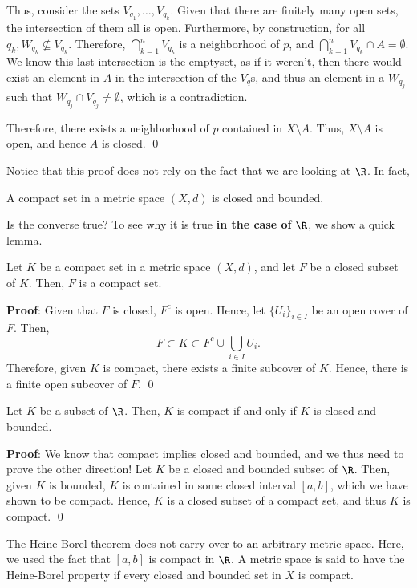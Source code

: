 Thus, consider the sets $V_{q_1}, \dots, V_{q_k}$. Given that there are finitely many open sets, the intersection of them all is open. Furthermore, by construction, for all $q_k, W_{q_k} \not\subseteq V_{q_k}$. Therefore, $\bigcap_{k=1}^n V_{q_k}$ is a neighborhood of $p$, and $\bigcap_{k=1}^n V_{q_k} \cap A = \emptyset$. We know this last intersection is the emptyset, as if it weren't, then there would exist an element in $A$ in the intersection of the $V_q$s, and thus an element in a $W_{q_j}$ such that $W_{q_j} \cap V_{q_j} \neq \emptyset$, which is a contradiction. 

Therefore, there exists a neighborhood of $p$ contained in $X\setminus A$. Thus, $X\setminus A$ is open, and hence $A$ is closed. \qed 

Notice that this proof does not rely on the fact that we are looking at $\R$. In fact,
\begin{lemma}
A compact set in a metric space $(X,d)$ is closed and bounded.
\end{lemma}

Is the converse true? To see why it is true \textbf{in the case of} $\R$, we show a quick lemma.
\begin{lemma}
Let $K$ be a compact set in a metric space $(X,d)$, and let $F$ be a closed subset of $K$. Then, $F$ is a compact set.
\end{lemma}
\textbf{Proof}: Given that $F$ is closed, $F^c$ is open. Hence, let $\{U_i\}_{i\in I}$ be an open cover of $F$. Then, 
\[
F \subset K \subset F^c \cup \bigcup_{i\in I} U_i.
\]
Therefore, given $K$ is compact, there exists a finite subcover of $K$. Hence, there is a finite open subcover of $F$. \qed

\begin{theorem}
Let $K$ be a subset of $\R$. Then, $K$ is compact if and only if $K$ is closed and bounded.
\end{theorem}
\textbf{Proof}: We know that compact implies closed and bounded, and we thus need to prove the other direction! Let $K$ be a closed and bounded subset of $\R$. Then, given $K$ is bounded, $K$ is contained in some closed interval $[a,b]$, which we have shown to be compact. Hence, $K$ is a closed subset of a compact set, and thus $K$ is compact.
\qed 

\begin{remark}
The Heine-Borel theorem does not carry over to an arbitrary metric space. Here, we used the fact that $[a,b]$ is compact in $\R$. A metric space is said to have the Heine-Borel property if every closed and bounded set in $X$ is compact.
\end{remark}

